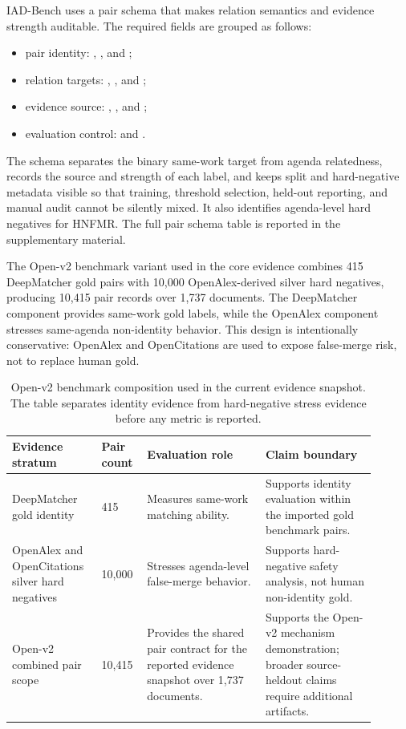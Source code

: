 \documentclass[preprint,12pt]{elsarticle}
\begin{document}
IAD-Bench uses a pair schema that makes relation semantics and evidence strength auditable. The required fields are grouped as follows:
\begin{itemize}
\setlength{\itemsep}{0pt}
\item pair identity: , , and ;
\item relation targets: , , and ;
\item evidence source: , , and ;
\item evaluation control:  and .
\end{itemize}
The schema separates the binary same-work target from agenda relatedness, records the source and strength of each label, and keeps split and hard-negative metadata visible so that training, threshold selection, held-out reporting, and manual audit cannot be silently mixed. It also identifies agenda-level hard negatives for HNFMR. The full pair schema table is reported in the supplementary material.

The Open-v2 benchmark variant used in the core evidence combines 415 DeepMatcher gold pairs with 10,000 OpenAlex-derived silver hard negatives, producing 10,415 pair records over 1,737 documents. The DeepMatcher component provides same-work gold labels, while the OpenAlex component stresses same-agenda non-identity behavior. This design is intentionally conservative: OpenAlex and OpenCitations are used to expose false-merge risk, not to replace human gold.

\begin{table}[H]
\caption{Open-v2 benchmark composition used in the current evidence snapshot. The table separates identity evidence from hard-negative stress evidence before any metric is reported.}
\label{tab:openv2-composition}
\centering
\footnotesize
\setlength{\tabcolsep}{3pt}
\begin{tabular}{L{0.22\linewidth}L{0.10\linewidth}L{0.30\linewidth}L{0.28\linewidth}}
\toprule
Evidence stratum & Pair count & Evaluation role & Claim boundary \\
\midrule
DeepMatcher gold identity & 415 & Measures same-work matching ability. & Supports identity evaluation within the imported gold benchmark pairs. \\
OpenAlex and OpenCitations silver hard negatives & 10,000 & Stresses agenda-level false-merge behavior. & Supports hard-negative safety analysis, not human non-identity gold. \\
Open-v2 combined pair scope & 10,415 & Provides the shared pair contract for the reported evidence snapshot over 1,737 documents. & Supports the Open-v2 mechanism demonstration; broader source-heldout claims require additional artifacts. \\
\bottomrule
\end{tabular}
\end{table}
\end{document}

